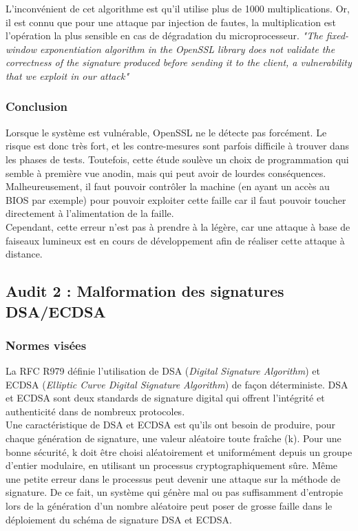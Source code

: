 			L'inconvénient de cet algorithme est qu'il utilise plus de 1000 multiplications. Or, il est connu que pour une attaque par injection de fautes, la multiplication est l'opération la plus sensible en cas de dégradation du microprocesseur. \textit{"The fixed-window exponentiation algorithm in the OpenSSL library does not validate the correctness of the signature produced before sending it to the client, a vulnerability that we exploit in our attack"}\\
			

		\subsubsection{Conclusion}

			Lorsque le système est vulnérable, OpenSSL ne le détecte pas forcément. Le risque est donc très fort, et les contre-mesures sont parfois difficile à trouver dans les phases de tests. Toutefois, cette étude soulève un choix de programmation qui semble à première vue anodin, mais qui peut avoir de lourdes conséquences.\\

			Malheureusement, il faut pouvoir contrôler la machine (en ayant un accès au BIOS par exemple) pour pouvoir exploiter cette faille car il faut pouvoir toucher directement à l'alimentation de la faille.\\

			Cependant, cette erreur n'est pas à prendre à la légère, car une attaque à base de faiseaux lumineux est en cours de développement afin de réaliser cette attaque à distance.
		
\subsection{Audit 2 : Malformation des signatures DSA/ECDSA}
		\subsubsection{Normes visées}

		La RFC R979 \cite{rfc6979} définie l'utilisation de DSA (\textit{Digital Signature Algorithm}) et ECDSA (\textit{Elliptic Curve Digital Signature Algorithm}) de façon déterministe. DSA et ECDSA sont deux standards de signature digital qui offrent l'intégrité et authenticité dans de nombreux protocoles.\\

		Une caractéristique de DSA et ECDSA est qu'ils ont besoin de produire, pour chaque génération de signature, une valeur aléatoire toute fraîche (k). Pour une bonne sécurité, k doit être choisi aléatoirement et uniformément depuis un groupe d'entier modulaire, en utilisant un processus cryptographiquement sûre. Même une petite erreur dans le processus peut devenir une attaque sur la méthode de signature. De ce fait, un système qui génère mal ou pas suffisamment d'entropie lors de la génération d'un nombre aléatoire peut poser de grosse faille dans le déploiement du schéma de signature DSA et ECDSA.\\

